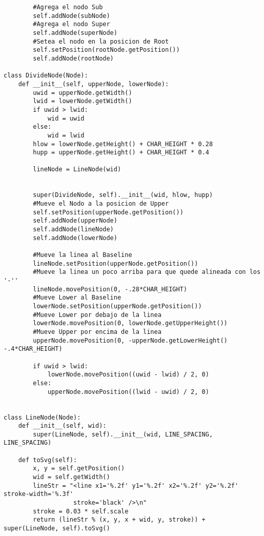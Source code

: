 \begin{verbatim}
		#Agrega el nodo Sub
        self.addNode(subNode)
        #Agrega el nodo Super                               
        self.addNode(superNode)
        #Setea el nodo en la posicion de Root                             
        self.setPosition(rootNode.getPosition())            
        self.addNode(rootNode)  

class DivideNode(Node):
    def __init__(self, upperNode, lowerNode):
        uwid = upperNode.getWidth()
        lwid = lowerNode.getWidth()
        if uwid > lwid:
            wid = uwid
        else:
            wid = lwid
        hlow = lowerNode.getHeight() + CHAR_HEIGHT * 0.28
        hupp = upperNode.getHeight() + CHAR_HEIGHT * 0.4

        lineNode = LineNode(wid)


        super(DivideNode, self).__init__(wid, hlow, hupp)
        #Mueve el Nodo a la posicion de Upper
        self.setPosition(upperNode.getPosition())               
        self.addNode(upperNode)
        self.addNode(lineNode)
        self.addNode(lowerNode)

		#Mueve la linea al Baseline
        lineNode.setPosition(upperNode.getPosition())
        #Mueve la linea un poco arriba para que quede alineada con los '-''               
        lineNode.movePosition(0, -.28*CHAR_HEIGHT)
        #Mueve Lower al Baseline                  
        lowerNode.setPosition(upperNode.getPosition())
        #Mueve Lower por debajo de la linea              
        lowerNode.movePosition(0, lowerNode.getUpperHeight())
        #Mueve Upper por encima de la linea       
        upperNode.movePosition(0, -upperNode.getLowerHeight() -.4*CHAR_HEIGHT) 

        if uwid > lwid:
            lowerNode.movePosition((uwid - lwid) / 2, 0)
        else:
            upperNode.movePosition((lwid - uwid) / 2, 0)


class LineNode(Node):
    def __init__(self, wid):
        super(LineNode, self).__init__(wid, LINE_SPACING, LINE_SPACING)

    def toSvg(self):
        x, y = self.getPosition()
        wid = self.getWidth()
        lineStr = "<line x1='%.2f' y1='%.2f' x2='%.2f' y2='%.2f' stroke-width='%.3f' 
        		   stroke='black' />\n"
        stroke = 0.03 * self.scale
        return (lineStr % (x, y, x + wid, y, stroke)) + super(LineNode, self).toSvg()
\end{verbatim}

